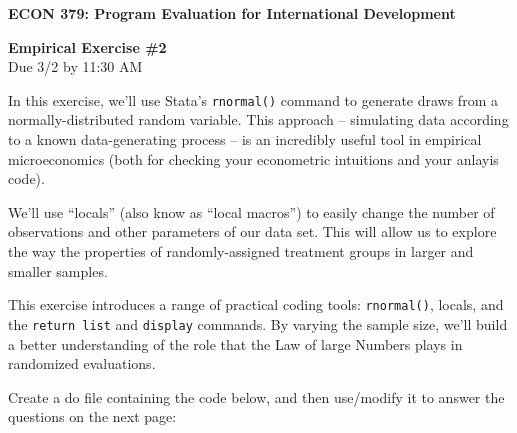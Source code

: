 \documentclass[11pt]{article}
\begin{document}
\begin{center}

\textbf{\large{ECON 379:  Program Evaluation for International Development}} \\

\bigskip

\textbf{\large{Empirical Exercise \#2}} \\ 
Due 3/2 by 11:30 AM 

\end{center}

\bigskip

\bigskip

In this exercise, we’ll use Stata’s \texttt{rnormal()} command to generate draws from a normally-distributed random variable. This approach -- simulating data according to a known data-generating process -- is an incredibly useful tool in empirical microeconomics (both for checking your econometric intuitions and your anlayis code).

\bigskip

We’ll use ``locals'' (also know as ``local macros'') to easily change the number of observations and other parameters of our data set. This will allow us to explore the way the properties of randomly-assigned treatment groups in larger and smaller samples.

\bigskip

This exercise introduces a range of practical coding tools: \texttt{rnormal()}, locals, and the \texttt{return list} and \texttt{display} commands. By varying the sample size, we’ll build a better understanding of the role that the Law of large Numbers plays in randomized evaluations.

\bigskip

Create a do file containing the code below, and then use/modify it to answer the questions on the next page:
\end{document}
